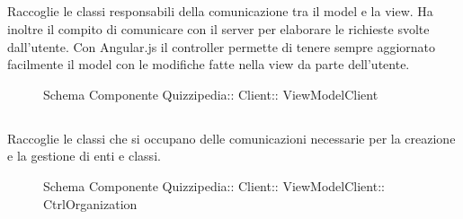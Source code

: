 \subsection{}
Raccoglie le classi responsabili della comunicazione tra il model e la view. Ha inoltre il compito di comunicare con il server per elaborare le richieste svolte dall'utente.
Con Angular.js il controller permette di tenere sempre aggiornato facilmente il model con le modifiche fatte nella view da parte dell'utente.
\begin{figure}[H]
\centering
\noindent{}
\caption[Schema Componente Quizzipedia::Client::ViewModelClient]{Schema Componente Quizzipedia:: Client:: ViewModelClient}
\end{figure}
\subsection{}
Raccoglie le classi che si occupano delle comunicazioni necessarie per la creazione e la gestione di enti e classi.
\begin{figure}[H]
\centering
\noindent{}
\caption[Schema Componente Quizzipedia::Client::ViewModelClient::CtrlOrganization]{Schema Componente Quizzipedia:: Client:: ViewModelClient:: CtrlOrganization}
\end{figure}
